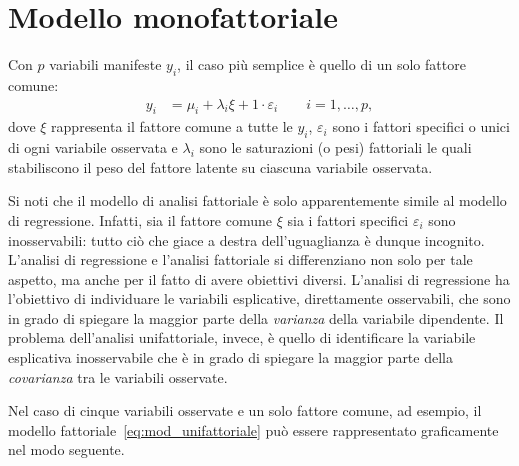 \section{Modello monofattoriale}

Con $p$ variabili manifeste $y_i$, il caso più semplice è quello di un solo fattore comune:
\begin{align}
  y_i &= \mu_i + \lambda_{i} \xi +  1 \cdot \varepsilon_i \qquad i=1, \dots, p,
  \label{eq:mod_unifattoriale}
\end{align}
dove 
 $\xi$ rappresenta il fattore comune a tutte le $y_i$, 
 $\varepsilon_i$ sono i fattori specifici o unici di
  ogni variabile osservata e 
 $\lambda_i$ sono le saturazioni (o pesi) fattoriali le quali 
stabiliscono il peso del fattore latente su ciascuna
variabile osservata. 

Si noti che il modello di analisi fattoriale 
è solo apparentemente simile al modello di regressione.
Infatti, sia il fattore comune $\xi$ sia i fattori specifici $\varepsilon_i$ sono inosservabili: tutto ciò che giace a destra dell'uguaglianza è dunque incognito. 
L'analisi di regressione e l'analisi fattoriale si differenziano non solo per tale aspetto, ma anche per il fatto di avere obiettivi diversi.
L'analisi di regressione ha l'obiettivo di individuare le variabili esplicative, direttamente osservabili, che sono in grado di spiegare la maggior parte della \emph{varianza} della variabile dipendente.  
Il problema dell'analisi unifattoriale, invece, è quello di identificare la variabile esplicativa inosservabile che è in grado di spiegare la maggior parte della \emph{covarianza} tra le variabili osservate.

Nel caso di cinque variabili osservate e un solo fattore comune, ad esempio, il modello fattoriale~\ref{eq:mod_unifattoriale} può essere rappresentato graficamente nel modo seguente.

